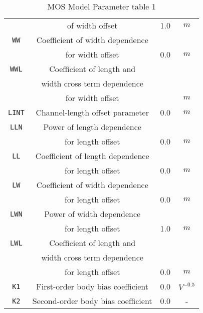 \documentclass{article}
\begin{document}
\begin{table}[H]
\begin{tabular}{|c| c| c| c|}
                             & of width offset & 1.0 & $m$\\
\texttt{WW} & Coefficient of width dependence & & \\
            & for width offset & 0.0 & $m$\\
\texttt{WWL} & Coefficient of length and & & \\
             & width cross term dependence & & \\
             & for width offset & & $m$\\
\texttt{LINT} & Channel-length offset parameter & 0.0 & $m$\\
\texttt{LLN} & Power of length dependence & & \\
             & for length offset & 0.0 & $m$\\
\texttt{LL} & Coefficient of length dependence & & \\
            & for length offset & 0.0 & $m$\\
\texttt{LW} & Coefficient of width dependence & & \\
            & for length offset & 0.0 & $m$\\
\texttt{LWN} & Power of width dependence & & \\
             & for length offset & 1.0 & $m$\\
\texttt{LWL} & Coefficient of length and & & \\
             & width cross term dependence & & \\
             & for length offset & 0.0 & $m$\\
\texttt{K1} & First-order body bias coefficient & 0.0 & $V^{-0.5}$\\
\texttt{K2} & Second-order body bias coefficient & 0.0 & -\\
\hline
\end{tabular}
\caption{\label{bsim4.params1} MOS Model Parameter table 1}
\end{table}
\end{document}
